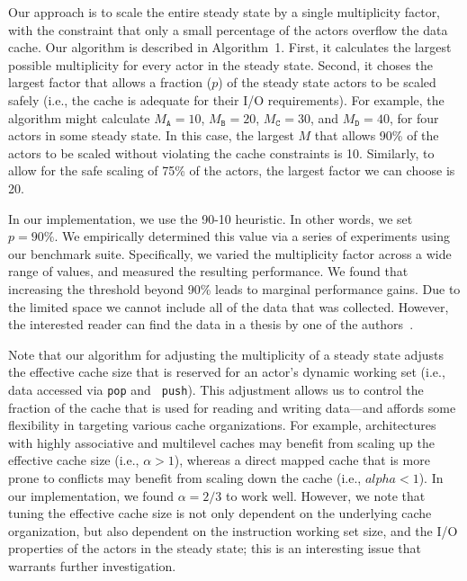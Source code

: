 Our approach is to scale the entire steady state by a single
multiplicity factor, with the constraint that only a small percentage
of the actors overflow the data cache. Our algorithm is described in
Algorithm~1. First, it calculates the largest possible multiplicity
for every actor in the steady state. Second, it choses the largest
factor that allows a fraction ($p$) of the steady state actors to be
scaled safely (i.e., the cache is adequate for their I/O
requirements).  For example, the algorithm might calculate
$M_\texttt{A} = 10$,
$M_\texttt{B} = 20$, 
$M_\texttt{C} = 30$, and 
$M_\texttt{D} = 40$, for four actors in some steady state.
In this case, the largest $M$ that allows 90\% of the actors to be
scaled without violating the cache constraints is 10.
Similarly, to allow for the safe scaling of 75\% of the actors, the
largest factor we can choose is 20.

In our implementation, we use the 90-10 heuristic. In other words, we
set $p=90\%$. We empirically determined this value via a series of
experiments using our benchmark suite. Specifically, we varied the
multiplicity factor across a wide range of values,
and measured the resulting performance. We found that
increasing the threshold beyond 90\% leads to marginal
performance gains. Due to the limited space we cannot include all of
the data that was collected. However, the interested reader can find
the data in a thesis by one of the authors~\cite{janis-thesis}.

Note that our algorithm for adjusting the multiplicity of a steady
state adjusts the effective cache size that is reserved for an actor's
dynamic working set (i.e., data accessed via {\tt pop} and {\tt
push}). This adjustment allows us to control the fraction of the cache
that is used for reading and writing data---and affords some
flexibility in targeting various cache organizations.  For example,
architectures with highly associative and multilevel caches may benefit
from scaling up the effective cache size (i.e., $\alpha > 1$), whereas
a direct mapped cache that is more prone to conflicts may benefit from
scaling down the cache (i.e., $alpha < 1$). In our implementation, we
found $\alpha=2/3$ to work well. However, we note that tuning the
effective cache size is not only dependent on the underlying cache
organization, but also dependent on the instruction  working
set size, and the  I/O properties of the actors in the steady
state; this is an interesting issue that warrants further investigation.
